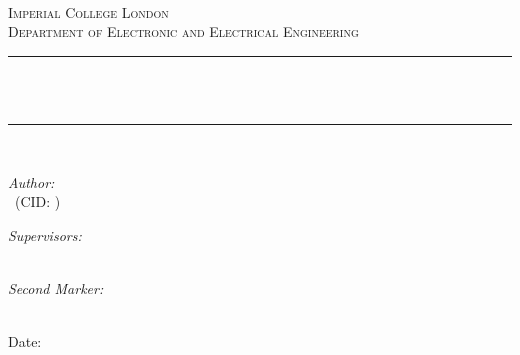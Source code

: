 \begin{titlepage}

\newcommand{\HRule}{\rule{\linewidth}{0.5mm}} %




\begin{center} %

\textsc{\LARGE \reporttype}\\[1.5cm] 
\textsc{\Large Imperial College London}\\[0.5cm] 
\textsc{\large Department of Electronic and Electrical Engineering}\\[0.5cm] 

\HRule \\[0.4cm]
{ \LARGE \bfseries \reporttitle}\\ %
\HRule \\[1.5cm]
\end{center}

\begin{flushleft} \large
\textit{Author:}\\
\reportauthor~(CID: \cid) %
\end{flushleft}
\vspace{1cm}

\begin{flushleft} \large
\textit{Supervisors:}\\
\supervisor \\%
\supervisorassistant
\end{flushleft}
\vspace{1cm}

\begin{flushleft} \large
\textit{Second Marker:}\\
\secondmarker\\
\end{flushleft}
\vspace{2cm}
\makeatletter
Date: \@date 

\vfill %



\makeatother


\end{titlepage}

